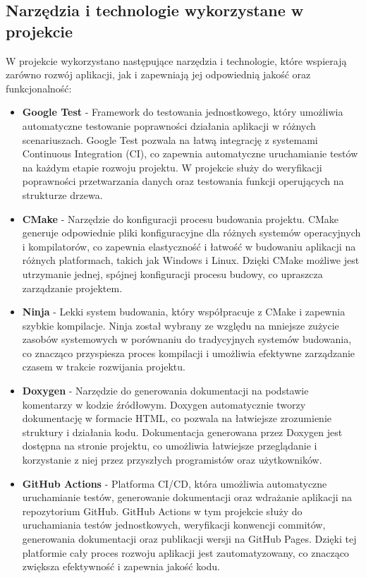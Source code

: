 \subsection{Narzędzia i technologie wykorzystane w projekcie}
W projekcie wykorzystano następujące narzędzia i technologie, które wspierają zarówno rozwój aplikacji, jak i zapewniają jej odpowiednią jakość oraz funkcjonalność:
\begin{itemize}
    \item \textbf{Google Test} - Framework do testowania jednostkowego, który umożliwia automatyczne testowanie poprawności działania aplikacji w różnych scenariuszach. Google Test pozwala na łatwą integrację z systemami Continuous Integration (CI), co zapewnia automatyczne uruchamianie testów na każdym etapie rozwoju projektu. W projekcie służy do weryfikacji poprawności przetwarzania danych oraz testowania funkcji operujących na strukturze drzewa.
    \item \textbf{CMake} - Narzędzie do konfiguracji procesu budowania projektu. CMake generuje odpowiednie pliki konfiguracyjne dla różnych systemów operacyjnych i kompilatorów, co zapewnia elastyczność i łatwość w budowaniu aplikacji na różnych platformach, takich jak Windows i Linux. Dzięki CMake możliwe jest utrzymanie jednej, spójnej konfiguracji procesu budowy, co upraszcza zarządzanie projektem.
    \item \textbf{Ninja} - Lekki system budowania, który współpracuje z CMake i zapewnia szybkie kompilacje. Ninja został wybrany ze względu na mniejsze zużycie zasobów systemowych w porównaniu do tradycyjnych systemów budowania, co znacząco przyspiesza proces kompilacji i umożliwia efektywne zarządzanie czasem w trakcie rozwijania projektu.
    \item \textbf{Doxygen} -  Narzędzie do generowania dokumentacji na podstawie komentarzy w kodzie źródłowym. Doxygen automatycznie tworzy dokumentację w formacie HTML, co pozwala na łatwiejsze zrozumienie struktury i działania kodu. Dokumentacja generowana przez Doxygen jest dostępna na stronie projektu, co umożliwia łatwiejsze przeglądanie i korzystanie z niej przez przyszłych programistów oraz użytkowników.
    \item \textbf{GitHub Actions} - Platforma CI/CD, która umożliwia automatyczne uruchamianie testów, generowanie dokumentacji oraz wdrażanie aplikacji na repozytorium GitHub. GitHub Actions w tym projekcie służy do uruchamiania testów jednostkowych, weryfikacji konwencji commitów, generowania dokumentacji oraz publikacji wersji na GitHub Pages. Dzięki tej platformie cały proces rozwoju aplikacji jest zautomatyzowany, co znacząco zwiększa efektywność i zapewnia jakość kodu.

\end{itemize}
